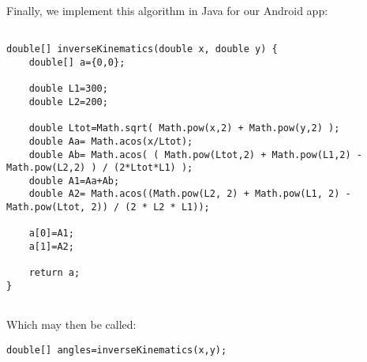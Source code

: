 \documentclass[11pt]{article}
\begin{document}
\vspace{2.5cm}
\begin{minipage}{\linewidth}%

Finally, we implement this algorithm in Java for our Android app:
	\begin{lstlisting}	
 
double[] inverseKinematics(double x, double y) {
	double[] a={0,0};

	double L1=300;
	double L2=200;

	double Ltot=Math.sqrt( Math.pow(x,2) + Math.pow(y,2) );
	double Aa= Math.acos(x/Ltot);
	double Ab= Math.acos( ( Math.pow(Ltot,2) + Math.pow(L1,2) - Math.pow(L2,2) ) / (2*Ltot*L1) );
	double A1=Aa+Ab;
	double A2= Math.acos((Math.pow(L2, 2) + Math.pow(L1, 2) - Math.pow(Ltot, 2)) / (2 * L2 * L1));

	a[0]=A1;
	a[1]=A2;

	return a;
}


\end{lstlisting}
\bigskip
Which may then be called:
\begin{lstlisting}	
double[] angles=inverseKinematics(x,y);
\end{lstlisting}
\end{minipage}
\end{document}
